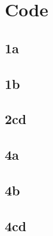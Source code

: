 \appendix
\singlespacing
\section{Code}
\subsection{1a}\label{app:1a}


\subsection{1b}\label{app:1b}


\subsection{2cd}\label{app:2cd}


\subsection{4a}\label{app:4a}


\subsection{4b}\label{app:4b}


\subsection{4cd}\label{app:4cd}
